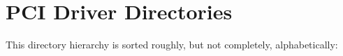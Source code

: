 \section{PCI Driver Directories}
This directory hierarchy is sorted roughly, but not completely, alphabetically:\begin{CompactList}
\item {}
\begin{CompactList}
\item {}
\end{CompactList}
\item {}
\begin{CompactList}
\item {}
\end{CompactList}
\end{CompactList}
